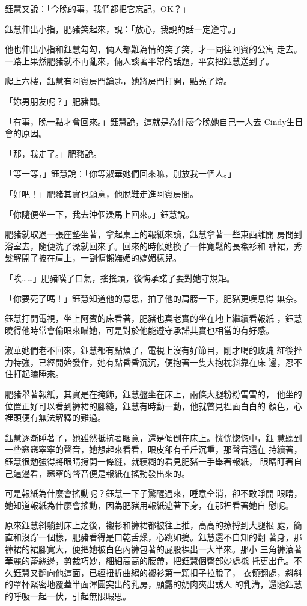 鈺慧又說：「今晚的事，我們都把它忘記，OK？」

鈺慧伸出小指，肥豬笑起來，說：「放心，我說的話一定遵守。」

他也伸出小指和鈺慧勾勾，倆人都難為情的笑了笑，才一同往阿賓的公寓
走去。一路上果然肥豬就不再亂來，倆人談著平常的話題，平安把鈺慧送到了。

爬上六樓，鈺慧有阿賓房門鑰匙，她將房門打開，點亮了燈。

「妳男朋友呢？」肥豬問。

「有事，晚一點才會回來。」鈺慧說，這就是為什麼今晚她自己一人去
Cindy生日會的原因。

「那，我走了。」肥豬說。

「等一等，」鈺慧說：「你等淑華她們回來嘛，別放我一個人。」

「好吧！」肥豬其實也願意，他脫鞋走進阿賓房間。

「你隨便坐一下，我去沖個澡馬上回來。」鈺慧說。

肥豬就取過一張座墊坐著，拿起桌上的報紙來讀，鈺慧拿著一些東西離開
房間到浴室去，隨便洗了澡就回來了。回來的時候她換了一件寬鬆的長襯衫和
褲裙，秀髮解開了披在肩上，一副慵懶嫵媚的嬌媚樣兒。

「唉……」肥豬嘆了口氣，搖搖頭，後悔承諾了要對她守規矩。

「你要死了嗎！」鈺慧知道他的意思，拍了他的肩膀一下，肥豬更嘆息得
無奈。

鈺慧打開電視，坐上阿賓的床看著，肥豬也真老實的坐在地上繼續看報紙
，鈺慧曉得他時常會偷眼來瞄她，可是對於他能遵守承諾其實也相當的有好感。

淑華她們老不回來，鈺慧都有點煩了，電視上沒有好節目，剛才喝的玫瑰
紅後挫力特強，已經開始發作，她有點昏昏沉沉，便抱著一隻大抱枕斜靠在床
邊，忍不住打起瞌睡來。

肥豬舉著報紙，其實是在掩飾，鈺慧盤坐在床上，兩條大腿粉粉雪雪的，
他坐的位置正好可以看到褲裙的腳縫，鈺慧有時動一動，他就瞥見裡面白白的
顏色，心裡頭便有無法解釋的難過。

鈺慧逐漸睡著了，她雖然抵抗著睏意，還是傾倒在床上。恍恍惚惚中，鈺
慧聽到一些窸窸窣窣的聲音，她想起來看看，眼皮卻有千斤沉重，那聲音還在
持續著，鈺慧很勉強得將眼睛撐開一條縫，就糢糊的看見肥豬一手舉著報紙，
眼睛盯著自己這邊看，窸窣的聲音便是報紙在搖動發出來的。

可是報紙為什麼會搖動呢？鈺慧一下子驚醒過來，睡意全消，卻不敢睜開
眼睛，她知道報紙為什麼會搖動，因為肥豬用報紙遮著下身，在那裡看著她自
慰呢。

原來鈺慧斜躺到床上之後，襯衫和褲裙都被往上推，高高的撩捋到大腿根
處，簡直和沒穿一個樣，肥豬看得是口乾舌燥，心跳如搗。鈺慧還不自知的翻
著身，那褲裙的裙腳寬大，便把她被白色內褲包著的屁股裸出一大半來。那小
三角褲滾著華麗的蕾絲邊，剪裁巧妙，細細高高的腰帶，把鈺慧個臀部妙處襯
托更出色。不久鈺慧又翻向他這面，已經扭折曲縐的襯衫第一顆扣子拉脫了，
衣領翻處，斜斜的罩杯緊密地覆蓋半面渾圓突出的乳房，顯露的奶肉夾出誘人
的乳溝，還隨鈺慧的呼吸一起一伏，引起無限暇思。

